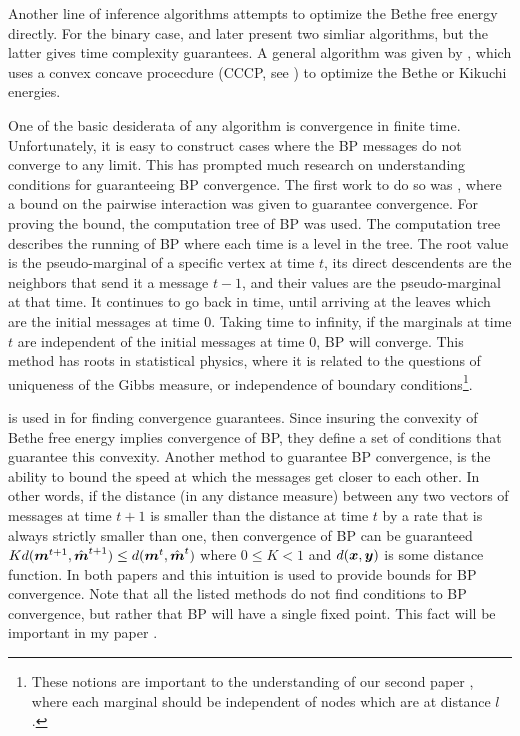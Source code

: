 Another line of inference algorithms attempts to optimize the Bethe free energy directly.
For the binary case, \cite{welling2001belief} and later \cite{shin2012complexity} present two simliar algorithms, but the latter gives time complexity guarantees. A general algorithm was given by \cite{yuille2002cccp}, which uses a convex concave procecdure (CCCP, see \cite{yuille2002concave}) to optimize the Bethe or Kikuchi energies.

One of the basic desiderata of any algorithm is convergence in finite time. Unfortunately, it is easy to construct cases where the
BP messages do not converge to any limit. This has prompted much research on understanding conditions for guaranteeing BP convergence.
The first work to do so was \cite{tatikonda2002loopy}, where a bound on the pairwise interaction was given to guarantee convergence.
For proving the bound, the computation tree of BP was used.
The computation tree describes the running of BP where each time is a level in the tree.
The root value is the pseudo-marginal of a specific vertex at time $t$, its direct descendents are the neighbors that send it a message $t-1$, and their values are the pseudo-marginal at that time.
It continues to go back in time, until arriving at the leaves which are the initial messages at time $0$.
Taking time to infinity, if the marginals at time $t$ are independent of the initial messages at time $0$, BP will converge.
This method has roots in statistical physics, where it is related to the questions of uniqueness of the Gibbs measure, or independence of boundary conditions\footnote{These notions are important to the understanding of our second paper \cite{heinemann2014inferning}, where each marginal should be independent of nodes which are at distance $l$.}.

 is used in \cite{heskes2004uniqueness} for finding convergence guarantees.
Since insuring the convexity of Bethe free energy implies convergence of BP, they define a set of conditions that guarantee this convexity.
Another method to guarantee BP convergence, is the ability to bound the speed at which the messages get closer to each other.
In other words, if the distance (in any distance measure) between any two vectors of messages at time $t+1$ is smaller than the distance at time $t$ by a rate that is always strictly smaller than one, then convergence of BP can be guaranteed $ K d(\boldsymbol{m}^{t+1}, \hat{\boldsymbol{m}}^{t+1}) \leq d(\boldsymbol{m}^t, \hat{\boldsymbol{m}}^t)$ where $0\leq K<1$ and $d(\boldsymbol{x},\boldsymbol{y})$ is some distance function.
In both papers \cite{mooij2007sufficient} and \cite{roosta2008convergence} this intuition is used to provide bounds for BP convergence.
Note that all the listed methods do not find conditions to BP convergence, but rather that BP will have a single fixed point.
This fact will be important in my paper \cite{heinemann2012cannot}.

